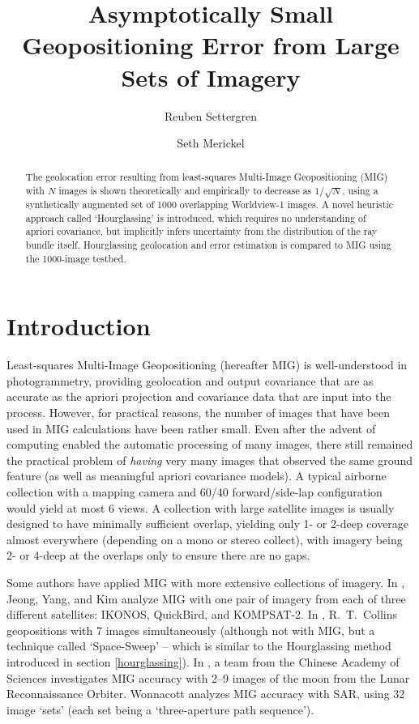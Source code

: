\documentclass[10pt]{amsart}
\begin{document}
\newcommand{\Iimg}{\mathcal{I}}
\newcommand{\Pimg}{\mathcal{P}}

\title[Small Geopositioning Error from Many Images]
{Asymptotically Small Geopositioning Error from Large Sets of Imagery}
\author[Settergren]{Reuben Settergren}
\author[Merickel]{Seth Merickel}

\begin{abstract}
The geolocation error resulting from least-squares Multi-Image Geopositioning
(MIG) with $N$ images is shown theoretically and empirically to decrease as
$1/\sqrt{N}$, using a synthetically augmented set of 1000 overlapping
Worldview-1 images. A novel heuristic approach called `Hourglassing' is
introduced, which requires no understanding of apriori covariance, but
implicitly infers uncertainty from the distribution of the ray bundle
itself. Hourglassing geolocation and error estimation is compared to MIG using
the 1000-image testbed.
\end{abstract}
\maketitle

\section{Introduction}
Least-squares Multi-Image Geopositioning (hereafter MIG) is well-under\-stood in
photogrammetry\cite{LSQRMIG}, providing geolocation and output covariance that
are as accurate as the apriori projection and covariance data that are input
into the process. However, for practical reasons, the number of images that have
been used in MIG calculations have been rather small. Even after the advent of
computing enabled the automatic processing of many images, there still remained
the practical problem of {\em having} very many images that observed the same
ground feature (as well as meaningful apriori covariance models). A typical
airborne collection with a mapping camera and 60/40 forward/side-lap
configuration would yield at most 6 views. A collection with large satellite
images is usually designed to have minimally sufficient overlap, yielding only
1- or 2-deep coverage almost everywhere (depending on a mono or stereo collect),
with imagery being 2- or 4-deep at the overlaps only to ensure there are no gaps.

Some authors have applied MIG with more extensive collections of imagery. In
\cite{JEONG_SIX}, Jeong, Yang, and Kim analyze MIG with one pair of imagery from
each of three different satellites: IKONOS, QuickBird, and KOMPSAT-2. In
\cite{PLANE_COLLINS}, R.~T.~Collins geopositions with 7 images simultaneously
(although not with MIG, but a technique called `Space-Sweep' -- which is
similar to the Hourglassing method introduced in section \ref{hourglassing}).
In \cite{LRO_NINE}, a team from the Chinese Academy of Sciences investigates MIG
accuracy with 2--9 images of the moon from the Lunar Reconnaissance
Orbiter. Wonnacott \cite{WONNACOT_32_3} analyzes MIG accuracy with SAR, using 32
image `sets' (each set being a `three-aperture path sequence').
\end{document}

